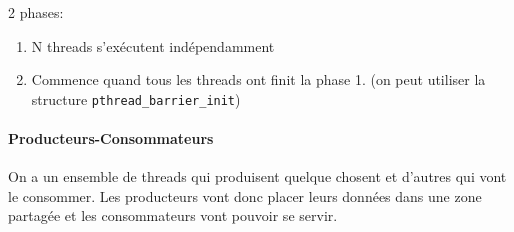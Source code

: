 2 phases:

\begin{enumerate}
\def\labelenumi{\arabic{enumi}.}
\tightlist
\item
  N threads s'exécutent indépendamment
\item
  Commence quand tous les threads ont finit la phase 1. (on peut
  utiliser la structure \texttt{pthread\_barrier\_init})
\end{enumerate}

\begin{Shaded}
\begin{Highlighting}[]
\OperatorTok{;} 
\OperatorTok{;} 
\OperatorTok{=}\OperatorTok{;} 

\OperatorTok{(\&}\OperatorTok{,}\OperatorTok{,}\OperatorTok{)}

\OperatorTok{();} 

\OperatorTok{(\&}\OperatorTok{);}\OperatorTok{++;} 
\OperatorTok{(}\OperatorTok{==}\OperatorTok{)} \OperatorTok{\{}
\OperatorTok{(\&}\OperatorTok{);}
\OperatorTok{\}}
\OperatorTok{(\&}\OperatorTok{);} 
\OperatorTok{(\&}\OperatorTok{);}
\OperatorTok{(\&}\OperatorTok{);}

\OperatorTok{();}
\end{Highlighting}
\end{Shaded}

\paragraph{Producteurs-Consommateurs}\label{producteurs-consommateurs}

On a un ensemble de threads qui produisent quelque chosent et d'autres
qui vont le consommer. Les producteurs vont donc placer leurs données
dans une zone partagée et les consommateurs vont pouvoir se servir.


